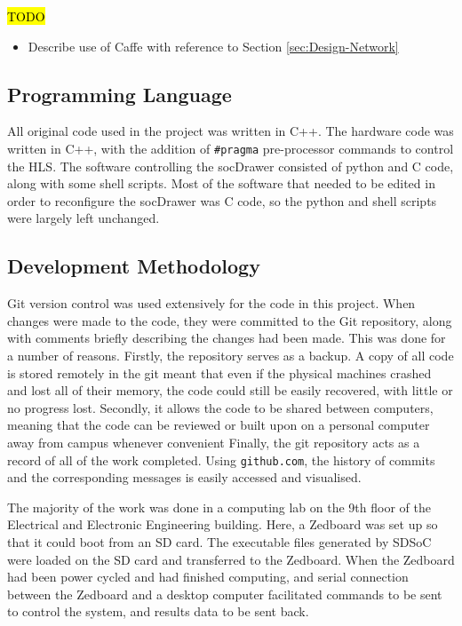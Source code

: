 \documentclass[12pt]{article}
\begin{document}
\hl{TODO}

\begin{itemize}
\item Describe use of Caffe with reference to Section \ref{sec:Design-Network}
\end{itemize}

\subsection{Programming Language}
\label{sec:Imp-Language}

All original code used in the project was written in C++. The hardware code was written in C++, with the addition of \lstinline|#pragma| pre-processor commands to control the HLS. The software controlling the socDrawer consisted of python and C code, along with some shell scripts. Most of the software that needed to be edited in order to reconfigure the socDrawer was C code, so the python and shell scripts were largely left unchanged.

\subsection{Development Methodology}
\label{sec:Imp-Devlopment}

Git version control was used extensively for the code in this project. When changes were made to the code, they were committed to the Git repository, along with comments briefly describing the changes had been made. This was done for a number of reasons. Firstly, the repository serves as a backup. A copy of all code is stored remotely in the git meant that even if the physical machines crashed and lost all of their memory, the code could still be easily recovered, with little or no progress lost. Secondly, it allows the code to be shared between computers, meaning that the code can be reviewed or built upon on a personal computer away from campus whenever convenient Finally, the git repository acts as a record of all of the work completed. Using \lstinline|github.com|, the history of commits and the corresponding messages is easily accessed and visualised. 

The majority of the work was done in a computing lab on the 9th floor of the Electrical and Electronic Engineering building. Here, a Zedboard was set up so that it could boot from an SD card. The executable files generated by SDSoC were loaded on the SD card and transferred to the Zedboard. When the Zedboard had been power cycled and had finished computing, and serial connection between the Zedboard and a desktop computer facilitated commands to be sent to control the system, and results data to be sent back.
\end{document}
